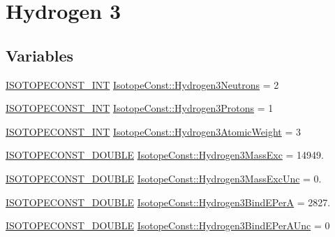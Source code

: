 \hypertarget{group___isotope_const-_hydrogen-_h3}{}\section{Hydrogen 3}
\label{group___isotope_const-_hydrogen-_h3}
\subsection*{Variables}
\begin{DoxyCompactItemize}
\item 
\mbox{\hyperlink{group___isotope_const-_macros_ga5f18360b3e99483a35c32d789e62621c}{I\+S\+O\+T\+O\+P\+E\+C\+O\+N\+S\+T\+\_\+\+I\+NT}} \mbox{\hyperlink{group___isotope_const-_hydrogen-_h3_ga88d18d6075c341947c82e48fe87c1503}{Isotope\+Const\+::\+Hydrogen3\+Neutrons}} = 2
\item 
\mbox{\hyperlink{group___isotope_const-_macros_ga5f18360b3e99483a35c32d789e62621c}{I\+S\+O\+T\+O\+P\+E\+C\+O\+N\+S\+T\+\_\+\+I\+NT}} \mbox{\hyperlink{group___isotope_const-_hydrogen-_h3_ga20e3b22ea2d3c61d2450a6a2a49971ca}{Isotope\+Const\+::\+Hydrogen3\+Protons}} = 1
\item 
\mbox{\hyperlink{group___isotope_const-_macros_ga5f18360b3e99483a35c32d789e62621c}{I\+S\+O\+T\+O\+P\+E\+C\+O\+N\+S\+T\+\_\+\+I\+NT}} \mbox{\hyperlink{group___isotope_const-_hydrogen-_h3_gae3fae7359715f708bf35af8e11c7ee96}{Isotope\+Const\+::\+Hydrogen3\+Atomic\+Weight}} = 3
\item 
\mbox{\hyperlink{group___isotope_const-_macros_ga8f45a7272ce02c0b4c65c44636ed719a}{I\+S\+O\+T\+O\+P\+E\+C\+O\+N\+S\+T\+\_\+\+D\+O\+U\+B\+LE}} \mbox{\hyperlink{group___isotope_const-_hydrogen-_h3_gaa40ef68be116555ca4be81d0c3c4e459}{Isotope\+Const\+::\+Hydrogen3\+Mass\+Exc}} = 14949.
\item 
\mbox{\hyperlink{group___isotope_const-_macros_ga8f45a7272ce02c0b4c65c44636ed719a}{I\+S\+O\+T\+O\+P\+E\+C\+O\+N\+S\+T\+\_\+\+D\+O\+U\+B\+LE}} \mbox{\hyperlink{group___isotope_const-_hydrogen-_h3_ga9da6defb1f28dce3bb9b5468497a7f9e}{Isotope\+Const\+::\+Hydrogen3\+Mass\+Exc\+Unc}} = 0.
\item 
\mbox{\hyperlink{group___isotope_const-_macros_ga8f45a7272ce02c0b4c65c44636ed719a}{I\+S\+O\+T\+O\+P\+E\+C\+O\+N\+S\+T\+\_\+\+D\+O\+U\+B\+LE}} \mbox{\hyperlink{group___isotope_const-_hydrogen-_h3_ga61e8c77eb02d5f0decfc9ca3cc9ea208}{Isotope\+Const\+::\+Hydrogen3\+Bind\+E\+PerA}} = 2827.
\item 
\mbox{\hyperlink{group___isotope_const-_macros_ga8f45a7272ce02c0b4c65c44636ed719a}{I\+S\+O\+T\+O\+P\+E\+C\+O\+N\+S\+T\+\_\+\+D\+O\+U\+B\+LE}} \mbox{\hyperlink{group___isotope_const-_hydrogen-_h3_ga0dc01431289fa5c53936cee0c0607fc3}{Isotope\+Const\+::\+Hydrogen3\+Bind\+E\+Per\+A\+Unc}} = 0

\end{DoxyCompactItemize}
